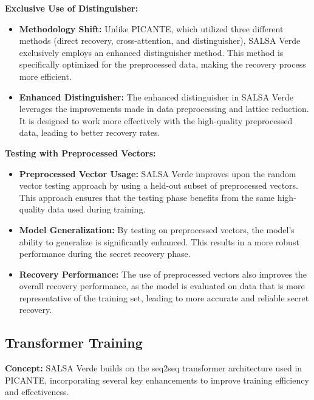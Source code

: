 \documentclass{article}
\begin{document}
\vspace{3mm}

\textbf{Exclusive Use of Distinguisher:}

\begin{itemize}
    \item \textbf{Methodology Shift:} Unlike PICANTE, which utilized three different methods (direct recovery, cross-attention, and distinguisher), SALSA Verde exclusively employs an enhanced distinguisher method. This method is specifically optimized for the preprocessed data, making the recovery process more efficient.
    \item \textbf{Enhanced Distinguisher:} The enhanced distinguisher in SALSA Verde leverages the improvements made in data preprocessing and lattice reduction. It is designed to work more effectively with the high-quality preprocessed data, leading to better recovery rates.
\end{itemize}

\textbf{Testing with Preprocessed Vectors:}

\begin{itemize}
    \item \textbf{Preprocessed Vector Usage:} SALSA Verde improves upon the random vector testing approach by using a held-out subset of preprocessed vectors. This approach ensures that the testing phase benefits from the same high-quality data used during training.
    \item \textbf{Model Generalization:} By testing on preprocessed vectors, the model's ability to generalize is significantly enhanced. This results in a more robust performance during the secret recovery phase.
    \item \textbf{Recovery Performance:} The use of preprocessed vectors also improves the overall recovery performance, as the model is evaluated on data that is more representative of the training set, leading to more accurate and reliable secret recovery.
\end{itemize}

\subsection{Transformer Training}

\textbf{Concept:} SALSA Verde builds on the seq2seq transformer architecture used in PICANTE, incorporating several key enhancements to improve training efficiency and effectiveness.

\vspace{3mm}
\end{document}
